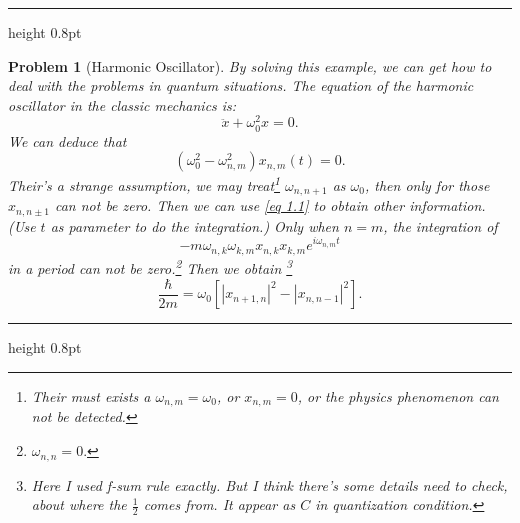 \documentclass{article}
\newcommand{\singleline}{\hrule height 0.8pt}
\theoremstyle{1}
\newtheorem{problem}{Problem}[section]
\begin{document}
\singleline
\begin{problem}[Harmonic Oscillator]
\quad 
By solving this example, we can get how to deal with the problems in quantum situations.
The equation of the harmonic oscillator in the classic mechanics is:
\begin{equation}
    \ddot{x}+\omega_0^2x=0.
\end{equation}
We can deduce that 
\begin{equation}
    \left(\omega^2_0-\omega_{n,m}^2\right)x_{n,m}(t)=0.
\end{equation}
Their's a strange assumption, we may treat\footnote{Their must exists a $\omega_{n,m}=\omega_0$, or $x_{n,m}=0$, or the physics phenomenon can not be detected.} $\omega_{n,n+1}$ as $\omega_0$, then only for those $x_{n,n\pm1}$ can not be zero. Then we can use \eqref{eq 1.1} to obtain other information. (Use $t$ as parameter to do the integration.)
\newline
Only when $n=m$, the integration of 
\begin{equation}
    -m \omega_{n,k}\omega_{k,m}x_{n,k}x_{k,m}e^{i\omega_{n,m}t}
\end{equation}
 in a period can not be zero.\footnote{$\omega_{n,n}=0.$} Then we obtain \footnote{Here I used f-sum rule exactly. But I think there's some details need to check, about where the $\frac{1}{2}$ comes from. It appear as $C$ in quantization condition.}
 \begin{equation}
    \frac{\hbar}{2m}=\omega_0\left[\left|x_{n+1,n}\right|^2-\left|x_{n,n-1}\right|^2\right].
 \end{equation}
\end{problem}
\singleline
\end{document}
